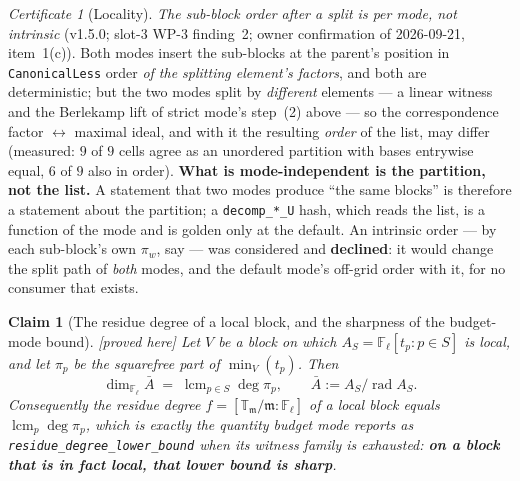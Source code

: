 \documentclass[11pt]{article}
\newtheorem{claim}[theorem]{Claim}
\theoremstyle{remark}
\newtheorem{certificate}[theorem]{Certificate}
\newcommand{\F}{\mathbb{F}}
\newcommand{\Fl}{\F_\ell}
\DeclareMathOperator{\rad}{rad}
\newcommand{\T}{\mathbb{T}}
\newcommand{\m}{\mathfrak{m}}
\newcommand{\PROVED}{\textsf{[proved here]}}
\begin{document}
\begin{certificate}[Locality]
\emph{The sub-block order after a split is per mode, not intrinsic} (v1.5.0; slot-3 WP-3
finding~2; owner confirmation of 2026-09-21, item~1(c)). Both modes insert the sub-blocks
at the parent's position in \texttt{CanonicalLess} order \emph{of the splitting element's
factors}, and both are deterministic; but the two modes split by \emph{different} elements
--- a linear witness and the Berlekamp lift of strict mode's step~(2) above ---
so the correspondence factor $\leftrightarrow$ maximal ideal, and with it the resulting
\emph{order} of the list, may differ (measured: $9$ of $9$ cells agree as an unordered
partition with bases entrywise equal, $6$ of $9$ also in order). \textbf{What is
mode-independent is the partition, not the list.} A statement that two modes produce ``the
same blocks'' is therefore a statement about the partition; a \texttt{decomp\_*\_U} hash,
which reads the list, is a function of the mode and is golden only at the default. An
intrinsic order --- by each sub-block's own $\pi_w$, say --- was considered and
\textbf{declined}: it would change the split path of \emph{both} modes, and the default
mode's off-grid order with it, for no consumer that exists.
\end{certificate}

\begin{claim}[The residue degree of a local block, and the sharpness of the budget-mode bound]\label{cl:sharpbound}\PROVED
Let $V$ be a block on which $A_S=\Fl[t_p:p\in S]$ is local, and let $\pi_p$ be the
squarefree part of $\min_V(t_p)$. Then
\[
  \dim_{\Fl}\bar A\;=\;\operatorname{lcm}_{p\in S}\deg\pi_p ,
  \qquad \bar A:=A_S/\rad A_S .
\]
Consequently the residue degree $f=[\T_\m/\m:\Fl]$ of a \emph{local} block equals
$\operatorname{lcm}_p\deg\pi_p$, which is exactly the quantity budget mode reports as
\texttt{residue\_degree\_lower\_bound} when its witness family is exhausted: \textbf{on a
block that is in fact local, that lower bound is sharp}.
\end{claim}
\end{document}
